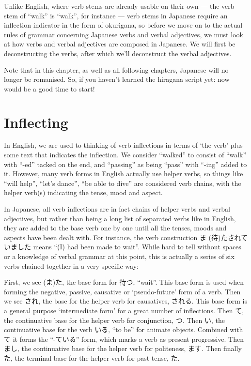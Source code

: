 \documentclass[11pt, b5paper, twoside, openright, onecolumn]{book}
\makeatletter
\newcommand*{\rubystack}[2]{{\relscale{0.5}%
  \begin{tabular}[b]{@{}c@{}}%
    {#1}\\%
   {\textscale{2}{#2}}%
  \end{tabular}}%
}
\DeclareRobustCommand*{\ruby}[2]{%
  \mbox{%
    \setlength{\parskip}{0ex}%
    \BeginAccSupp{method=pdfstringdef,ActualText={#1}}%
      \rubystack{\phantom{#2}}{#1}%
      \llap{%
        \rubystack{#2}{\phantom{#1}}%
      }%
    \EndAccSupp{}%
  }%
}
\renewcommand*{\ruby}[2]{#2 (#1)}%
\makeatother
\begin{document}
Unlike English‚ where verb stems are already usable on their own — the verb stem of “walk” is “walk”‚ for instance — verb stems in Japanese require an inflection indicator in the form of okurigana‚ so before we move on to the actual rules of grammar concerning Japanese verbs and verbal adjectives‚ we must look at how verbs and verbal adjectives are composed in Japanese. We will first be deconstructing the verbs‚ after which we’ll deconstruct the verbal adjectives.

Note that in this chapter‚ as well as all following chapters‚ Japanese will no longer be romanised. So‚ if you haven’t learned the hiragana script yet: now would be a good time to start!

\section{Inflecting}

In English‚ we are used to thinking of verb inflections in terms of ‘the verb’ plus some text that indicates the inflection. We consider “walked” to consist of “walk” with “-ed” tacked on the end‚ and “passing” as being “pass” with “-ing” added to it. However‚ many verb forms in English actually use helper verbs‚ so things like “will help”‚ “let’s dance”‚ “be able to dive” are considered verb chains‚ with the helper verb(s) indicating the tense‚ mood and aspect.

In Japanese‚ all verb inflections are in fact chains of helper verbs and verbal adjectives‚ but rather than being a long list of separated verbs like in English‚ they are added to the base verb one by one until all the tenses‚ moods and aspects have been dealt with. For instance‚ the verb construction \ruby{待}{ま}たされていました means “(I) had been made to wait”. While hard to tell without spaces or a knowledge of verbal grammar at this point‚ this is actually a series of six verbs chained together in a very specific way:

First‚ we see (ま)た‚ the  base form for 待つ‚ “wait”. This base form is used when forming the negative‚ passive‚ causative or ‘pseudo-future’ form of a verb. Then we see され‚ the  base for the helper verb for causatives‚ される. This base form is a general purpose ‘intermediate form’ for a great number of inflections. Then て‚ the continuative base for the helper verb for conjunction‚ つ. Then い‚ the continuative base for the verb いる‚ “to be” for animate objects. Combined with て it forms the “-ている” form‚ which marks a verb as present progressive. Then まし‚ the continuative base for the helper verb for politeness‚ ます. Then finally た‚ the terminal base for the helper verb for past tense‚ た.
\end{document}
